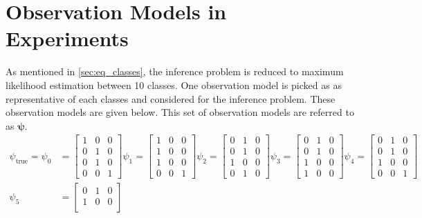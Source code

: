 \section{Observation Models in Experiments}
\label{ap:obs_set_exp}
As mentioned in \cref{sec:eq_classes}, the inference problem is reduced to maximum likelihood estimation between 10 classes. One observation model is picked as as representative of each classes and considered for the inference problem. These observation models are given below. This set of observation models are referred to as $ \symbf{\psi} $.
\begin{align}
\psi_{\text{true}} = \psi_{0} &=
\begin{bmatrix}
1 & 0 & 0 \\
0 & 1 & 0 \\
0 & 1 & 0 \\
0 & 0 & 1
\end{bmatrix}
\psi_{1} =
\begin{bmatrix}
1 & 0 & 0 \\
1 & 0 & 0 \\
1 & 0 & 0 \\
0 & 0 & 1
\end{bmatrix}
\psi_{2} =
\begin{bmatrix}
0 & 1 & 0 \\
0 & 1 & 0 \\
1 & 0 & 0 \\
0 & 1 & 0
\end{bmatrix}
\psi_{3} =
\begin{bmatrix}
0 & 1 & 0 \\
0 & 1 & 0 \\
1 & 0 & 0 \\
1 & 0 & 0
\end{bmatrix}
\psi_{4} =
\begin{bmatrix}
0 & 1 & 0 \\
0 & 1 & 0 \\
1 & 0 & 0 \\
0 & 0 & 1
\end{bmatrix} \nonumber\\
\psi_{5} &=
\begin{bmatrix}
0 & 1 & 0 \\
1 & 0 & 0 \\

\end{bmatrix}
\end{align}

